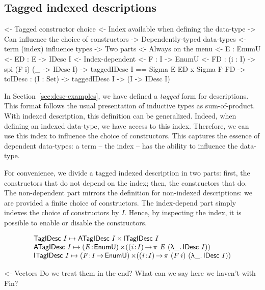 \subsection{Tagged indexed descriptions}

\begin{wstructure}
<- Tagged constructor choice
    <- Index available when defining the data-type
        -> Can influence the choice of constructors
        -> Dependently-typed data-types
            <- term (index) influence types
    -> Two parts
        <- Always on the menu
            <- E : EnumU 
            <- ED : E -> IDesc I
        <- Index-dependent
            <- F : I -> EnumU 
            <- FD : (i : I) -> spi (F i) (\_ -> IDesc I)
        -> taggedIDesc I == Sigma E ED x Sigma F FD
        -> toIDesc : (I : Set) -> taggedIDesc I -> (I -> IDesc I)
\end{wstructure}

In Section~\ref{sec:desc-examples}, we have defined a \emph{tagged}
form for descriptions. This format follows the usual presentation of
inductive types as sum-of-product. With indexed description, this
definition can be generalized. Indeed, when defining an indexed
data-type, we have access to this index. Therefore, we can use this
index to influence the choice of constructors. This captures the
essence of dependent data-types: a term -- the index -- has the
ability to influence the data-type.

For convenience, we divide a tagged indexed description in two parts:
first, the constructors that do not depend on the index; then, the
constructors that do. The non-dependent part mirrors the definition
for non-indexed descriptions: we are provided a finite choice of
constructors. The index-depend part simply indexes the choice of
constructors by $I$. Hence, by inspecting the index, it is possible to
enable or disable the constructors. 

\[\stk{
 \TagIDesc{I}  \mapsto \TIMES{\ATagIDesc{I}}{\ITagIDesc{I}} \\
 \ATagIDesc{I} \mapsto \SIGMA{\V{E}}{\EnumU} (\PI{\V{i}}{I} \spi{\V{E}}{(\LAM{\_} \IDesc{I})}) \\
 \ITagIDesc{I} \mapsto \SIGMA{\V{F}}{I \To \EnumU} (\PI{\V{i}}{I} \spi{(F\: i)}{(\LAM{\_} \IDesc{I})}) 
}\]


\begin{wstructure}
<- Vectors
    Do we treat them in the end? 
    What can we say here we haven't with Fin?
\end{wstructure}

